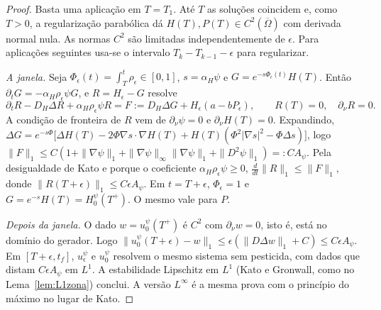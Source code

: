 \documentclass[11pt,a4paper]{article}
\numberwithin{equation}{section}
\theoremstyle{definition}
\theoremstyle{remark}
\begin{document}
\begin{proof}
Basta uma aplicação em $T=T_1$. Até $T$ as soluções coincidem e, como $T>0$, a regularização
parabólica dá $H(T),P(T)\in C^2(\overline\Omega)$ com derivada normal nula. As normas $C^2$ são
limitadas independentemente de $\epsilon$. Para aplicações seguintes usa-se o intervalo
$T_{k}-T_{k-1}-\epsilon$ para regularizar.

\emph{A janela.} Seja $\Phi_\epsilon(t)=\int_T^t\rho_\epsilon\in[0,1]$, $s=\alpha_H\psi$ e
$G=e^{-s\Phi_\epsilon(t)}H(T)$. Então $\partial_tG=-\alpha_H\rho_\epsilon\psi G$, e $R=H_\epsilon-G$ resolve
\[
\partial_tR-D_H\Delta R+\alpha_H\rho_\epsilon\psi R=F:=D_H\Delta G+H_\epsilon(a-bP_\epsilon),\qquad R(T)=0,\quad\partial_\nu R=0.
\]
A condição de fronteira de $R$ vem de $\partial_\nu\psi=0$ e $\partial_\nu H(T)=0$. Expandindo,
$\Delta G=e^{-s\Phi}\big[\Delta H(T)-2\Phi\nabla s\cdot\nabla H(T)+H(T)(\Phi^2|\nabla s|^2-\Phi\Delta s)\big]$,
logo $\|F\|_1\le C(1+\|\nabla\psi\|_1+\|\nabla\psi\|_\infty\|\nabla\psi\|_1+\|D^2\psi\|_1)=:CA_\psi$. Pela
desigualdade de Kato e porque o coeficiente $\alpha_H\rho_\epsilon\psi\ge0$,
$\frac{d}{dt}\|R\|_1\le\|F\|_1$, donde $\|R(T+\epsilon)\|_1\le C\epsilon A_\psi$. Em $t=T+\epsilon$,
$\Phi_\epsilon=1$ e $G=e^{-s}H(T)=H^\psi_0(T^+)$. O mesmo vale para $P$.

\emph{Depois da janela.} O dado $w=u^\psi_0(T^+)$ é $C^2$ com $\partial_\nu w=0$, isto é, está no domínio do
gerador. Logo $\|u^\psi_0(T+\epsilon)-w\|_1\le\epsilon(\|D\Delta w\|_1+C)\le C\epsilon A_\psi$. Em
$[T+\epsilon,t_f]$, $u^\psi_\epsilon$ e $u^\psi_0$ resolvem o mesmo sistema sem pesticida, com dados que
distam $C\epsilon A_\psi$ em $L^1$. A estabilidade Lipschitz em $L^1$ (Kato e Gronwall, como no
Lema~\ref{lem:L1zona}) conclui. A versão $L^\infty$ é a mesma prova com o princípio do máximo no lugar
de Kato.
\end{proof}
\end{document}
